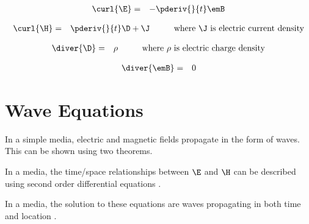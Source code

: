 \begin{axiom}
\label{axiom:mf}
\begin{eqnarray*}
   \curl{\E} &=& -\pderiv{}{t}\emB
\end{eqnarray*}
\end{axiom}

\begin{axiom}
\label{axiom:ma}
\begin{eqnarray*}
   \curl{\H} &=& \pderiv{}{t}\D + \J
   \hspace{1cm}\text{where $\J$ is electric current density}
\end{eqnarray*}
\end{axiom}

\begin{axiom}
\label{axiom:mgd}
\begin{eqnarray*}
   \diver{\D} &=& \rho
   \hspace{1cm}\text{where $\rho$ is electric charge density}
\end{eqnarray*}
\end{axiom}

\begin{axiom}
\label{axiom:mgb}
\begin{eqnarray*}
   \diver{\emB} &=& 0
\end{eqnarray*}
\end{axiom}

\section{Wave Equations}
In a simple media, electric and magnetic fields propagate in the form of waves.
This can be shown using two theorems.
\begin{liste}
   \item In a  media,
         the time/space relationships between $\E$ and $\H$
         can be described using second order differential equations
        .
   \item In a  media,
         the solution to these equations are waves propagating in both time and location
        .
\end{liste}

